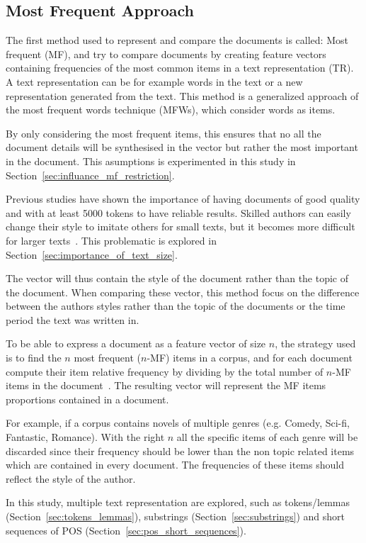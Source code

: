 \subsection{Most Frequent Approach}

The first method used to represent and compare the documents is called: Most frequent (MF), and try to compare documents by creating feature vectors containing frequencies of the most common items in a text representation (TR).
A text representation can be for example words in the text or a new representation generated from the text.
This method is a generalized approach of the most frequent words technique (MFWs), which consider words as items.

By only considering the most frequent items, this ensures that no all the document details will be synthesised in the vector but rather the most important in the document.
This asumptions is experimented in this study in Section~\ref{sec:influance_mf_restriction}.

Previous studies have shown the importance of having documents of good quality and with at least 5000 tokens to have reliable results.
Skilled authors can easily change their style to imitate others for small texts, but it becomes more difficult for larger texts~\cite{savoy_stylo}.
This problematic is explored in Section~\ref{sec:importance_of_text_size}.

The vector will thus contain the style of the document rather than the topic of the document.
When comparing these vector, this method focus on the difference between the authors styles rather than the topic of the documents or the time period the text was written in.

To be able to express a document as a feature vector of size $n$, the strategy used is to find the $n$ most frequent ($n$-MF) items in a corpus, and for each document compute their item relative frequency by dividing by the total number of $n$-MF items in the document~\cite{savoy_stylo}.
The resulting vector will represent the MF items proportions contained in a document.

For example, if a corpus contains novels of multiple genres (e.g. Comedy, Sci-fi, Fantastic, Romance).
With the right $n$ all the specific items of each genre will be discarded since their frequency should be lower than the non topic related items which are contained in every document.
The frequencies of these items should reflect the style of the author.

In this study, multiple text representation are explored, such as tokens/lemmas (Section~\ref{sec:tokens_lemmas}), substrings (Section~\ref{sec:substrings}) and short sequences of POS (Section~\ref{sec:pos_short_sequences}).

